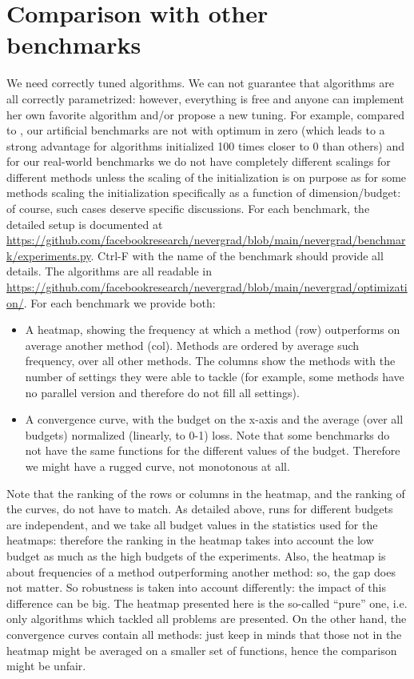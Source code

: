 \documentclass{article}
\begin{document}
\section{Comparison with other benchmarks}
We need correctly tuned algorithms. We can not guarantee that algorithms are all correctly parametrized: however, everything is free and anyone can implement her own favorite algorithm and/or propose a new tuning. For example, compared to \cite{lamcts}, our artificial benchmarks are not with optimum in zero (which leads to a strong advantage for algorithms initialized 100 times closer to 0 than others) and for our real-world benchmarks we do not have completely different scalings for different methods unless the scaling of the initialization is on purpose as for some methods scaling the initialization specifically as a function of dimension/budget: of course, such cases deserve specific discussions.
For each benchmark, the detailed setup is documented at \url{https://github.com/facebookresearch/nevergrad/blob/main/nevergrad/benchmark/experiments.py}.
Ctrl-F with the name of the benchmark should provide all details.
The algorithms are all readable in  \url{https://github.com/facebookresearch/nevergrad/blob/main/nevergrad/optimization/}.
For each benchmark we provide both:
\begin{itemize}
\item A heatmap, showing the frequency at which a method (row) outperforms on average another method (col). Methods are ordered by average such frequency, over all other methods.
The columns show the methods with the number of settings they were able to tackle (for example, some methods have no parallel version and therefore do not fill all settings).
\item A convergence curve, with the budget on the x-axis and the average (over all budgets) normalized (linearly, to 0-1) loss. Note that some benchmarks do not have the same functions for the different values of the budget. Therefore we might have a rugged curve, not monotonous at all. 
\end{itemize}
Note that the ranking of the rows or columns in the heatmap, and the ranking of the curves, do not have to match. As
detailed above, runs for different budgets are independent, and we take all budget values in the statistics used for the
heatmaps: therefore the ranking in the heatmap takes into account the low budget as much as the high budgets of the
experiments. Also, the heatmap is about frequencies of a method outperforming another method: so, the gap does not
matter. So robustness is taken into account differently: the impact of this difference can be big.
The heatmap presented here is the so-called ``pure'' one, i.e. only algorithms which tackled all problems are presented.
On the other hand, the convergence curves contain all methods: just keep in minds that those not in the heatmap might be
averaged on a smaller set of functions, hence the comparison might be unfair.
\end{document}
